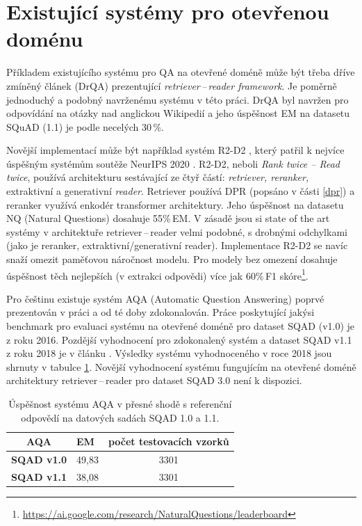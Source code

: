 \section{Existující systémy pro otevřenou doménu}
\label{existing_work}
Příkladem existujícího systému pro QA na otevřené doméně může být třeba dříve zmíněný článek \cite{drQA} (DrQA) prezentující \emph{retriever\,--\,reader framework}. Je poměrně jednoduchý a podobný navrženému systému v této práci. DrQA byl navržen pro odpovídání na otázky nad anglickou Wikipedií a jeho úspěšnost EM na datasetu SQuAD (1.1) je podle \cite{drQA} necelých 30\,\%.\par
Novější implementací může být například systém R2-D2 \cite{fajcik2021pruning}, který patřil k nejvíce úspěšným systémům soutěže NeurIPS 2020 \cite{min2021neurips}. R2-D2, neboli \textit{Rank twice -- Read twice}, používá architekturu sestávající ze čtyř částí: \emph{retriever, reranker, }extraktivní a generativní \emph{reader}. Retriever používá DPR \cite{dpr}(popsáno v části \ref{dpr}) a reranker využívá enkodér transformer architektury. Jeho úspěšnost na datasetu NQ (Natural Questions) dosahuje 55\%\,EM. V zásadě jsou si state of the art systémy v architektuře retriever\,--\,reader velmi podobné, s drobnými odchylkami (jako je reranker, extraktivní/generativní reader). Implementace \mbox{R2-D2} se navíc snaží omezit paměťovou náročnost modelu. Pro modely bez omezení dosahuje úspěšnost těch nejlepších (v extrakci odpovědi) více jak 60\%\,F1 skóre\footnote{\url{https://ai.google.com/research/NaturalQuestions/leaderboard}}.\par\medskip
Pro češtinu existuje systém AQA (Automatic Question Answering) poprvé prezentován v práci \cite{aqa} a od té doby zdokonalován. Práce \cite{aqa} poskytující jakýsi benchmark pro evaluaci systému na otevřené doméně pro dataset SQAD (v1.0) je z roku 2016. Pozdější vyhodnocení pro zdokonalený systém a dataset SQAD v1.1 z roku 2018 je v článku \cite{aqa2018}. Výsledky systému vyhodnoceného v roce 2018 jsou shrnuty v tabulce \ref{tab:aqa_benchmark}. Novější vyhodnocení systému fungujícím na otevřené doméně architektury retriever\,--\,reader pro dataset SQAD 3.0 není k dispozici.
\begin{table}[H]
\centering
    \begin{tabular}{|l|l|c|}
    \hline
    \multicolumn{1}{|c|}{{\textbf{AQA}}} & EM    & \multicolumn{1}{l|}{počet testovacích vzorků} \\ \hline
    \textbf{SQAD v1.0}                       & 49,83 & 3301                                         \\ \hline
    \textbf{SQAD v1.1}                       & 38,08 & 3301                                         \\ \hline
    \end{tabular}
\caption{Úspěšnost systému AQA v přesné shodě s referenční odpovědí na datových sadách SQAD 1.0 a 1.1.}
\label{tab:aqa_benchmark}
\end{table}


